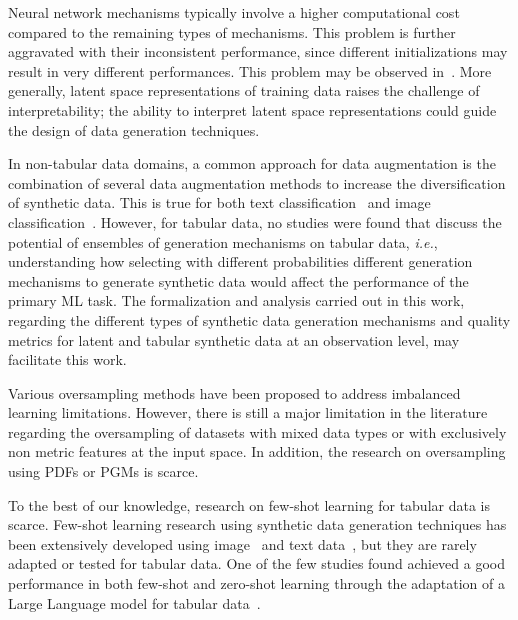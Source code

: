 Neural network mechanisms typically involve a higher computational cost
compared to the remaining types of mechanisms. This problem is further
aggravated with their inconsistent performance, since different
initializations may result in very different performances. This problem may be
observed in~\cite{douzas2018effective}. More generally, latent space
representations of training data raises the challenge of interpretability; the
ability to interpret latent space representations could guide the design of
data generation techniques. 

In non-tabular data domains, a common approach for data augmentation is the
combination of several data augmentation methods to increase the
diversification of synthetic data. This is true for both text
classification~\cite{bayer2021survey} and image
classification~\cite{grill2020bootstrap}. However, for tabular data, no
studies were found that discuss the potential of ensembles of generation
mechanisms on tabular data, \textit{i.e.}, understanding how selecting with
different probabilities different generation mechanisms to generate synthetic
data would affect the performance of the primary ML task. The formalization
and analysis carried out in this work, regarding the different types of
synthetic data generation mechanisms and quality metrics for latent and
tabular synthetic data at an observation level, may facilitate this work.


Various oversampling methods have been proposed to address imbalanced learning
limitations. However, there is still a major limitation in the literature
regarding the oversampling of datasets with mixed data types or with
exclusively non metric features at the input space. In addition, 
the research on oversampling using PDFs or PGMs is scarce.

To the best of our knowledge, research on few-shot learning for tabular data
is scarce. Few-shot learning research using synthetic data generation
techniques has been extensively developed using
image~\cite{cubuk2019autoaugment, zhao2019data} and text
data~\cite{zhou2021flipda}, but they are rarely adapted or tested for tabular
data. One of the few studies found achieved a good performance in both
few-shot and zero-shot learning through the adaptation of a Large Language
model for tabular data~\cite{hegselmann2022tabllm}. 


